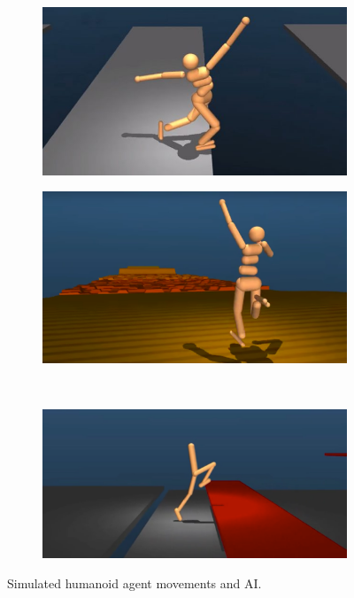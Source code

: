 \begin{figure}[ht]
  	\centering
  	\begin{subfigure}[b]{0.45\textwidth}
              \centering
	 		\includegraphics[height=0.13\textheight]{Chapter1/humanoid-deepmind1.jpg}	
     \end{subfigure}
     
	 \begin{subfigure}[b]{0.45\textwidth}
              \centering
	 		\includegraphics[height=0.13\textheight]{Chapter1/humanoid-deepmind2.png}
	 \end{subfigure}
	 ~~
      \begin{subfigure}[b]{0.45\textwidth}
              \centering
	  	    \includegraphics[height=0.13\textheight]{Chapter1/humanoid-deepmind3.png}
	 \end{subfigure}
	     
	 \caption{Simulated humanoid agent movements and AI.}
	\label{fig:humanoid_AI}
\end{figure}

